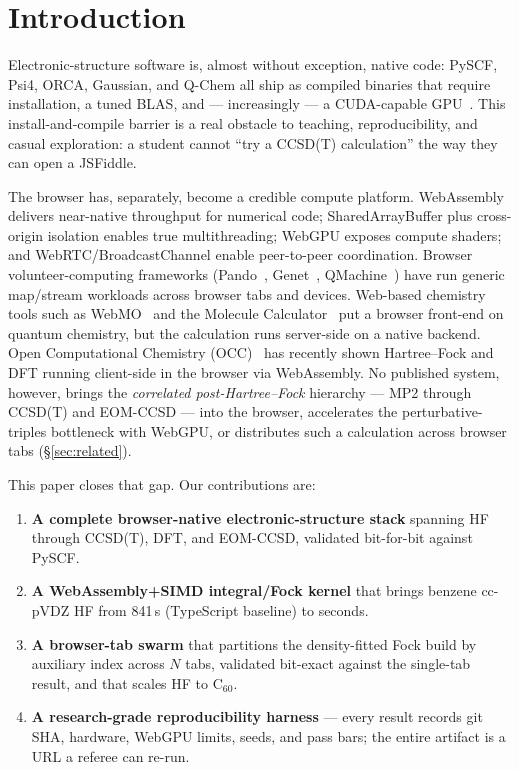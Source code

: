 \documentclass[11pt]{article}
\newcommand{\Csixty}{\ensuremath{\mathrm{C}_{60}}}
\begin{document}
\section{Introduction}

Electronic-structure software is, almost without exception, native code: PySCF,
Psi4, ORCA, Gaussian, and Q-Chem all ship as compiled binaries that require
installation, a tuned BLAS, and --- increasingly --- a CUDA-capable
GPU~\cite{gpu4pyscf,quick,veloxchem}. This install-and-compile barrier is a
real obstacle to teaching, reproducibility, and casual exploration: a student
cannot ``try a CCSD(T) calculation'' the way they can open a JSFiddle.

The browser has, separately, become a credible compute platform. WebAssembly
delivers near-native throughput for numerical code; SharedArrayBuffer plus
cross-origin isolation enables true multithreading; WebGPU exposes compute
shaders; and WebRTC/BroadcastChannel enable peer-to-peer coordination. Browser
volunteer-computing frameworks (Pando~\cite{pando}, Genet~\cite{genet},
QMachine~\cite{qmachine}) have run generic map/stream workloads across browser
tabs and devices. Web-based chemistry tools such as WebMO~\cite{webmo} and the
Molecule Calculator~\cite{molcalc} put a browser front-end on quantum chemistry,
but the calculation runs server-side on a native backend. Open Computational
Chemistry (OCC)~\cite{occ} has recently shown Hartree--Fock and DFT running
client-side in the browser via WebAssembly. No published system, however, brings
the \emph{correlated post-Hartree--Fock} hierarchy --- MP2 through CCSD(T) and
EOM-CCSD --- into the browser, accelerates the perturbative-triples bottleneck
with WebGPU, or distributes such a calculation across browser tabs
(\S\ref{sec:related}).

This paper closes that gap. Our contributions are:
\begin{enumerate}
  \item \textbf{A complete browser-native electronic-structure stack} spanning
  HF through CCSD(T), DFT, and EOM-CCSD, validated bit-for-bit against PySCF.
  \item \textbf{A WebAssembly+SIMD integral/Fock kernel} that brings benzene
  cc-pVDZ HF from 841\,s (TypeScript baseline) to seconds.
  \item \textbf{A browser-tab swarm} that partitions the density-fitted Fock
  build by auxiliary index across $N$ tabs, validated bit-exact against the
  single-tab result, and that scales HF to \Csixty{}.
  \item \textbf{A research-grade reproducibility harness} --- every result
  records git SHA, hardware, WebGPU limits, seeds, and pass bars; the entire
  artifact is a URL a referee can re-run.
\end{enumerate}
\end{document}
